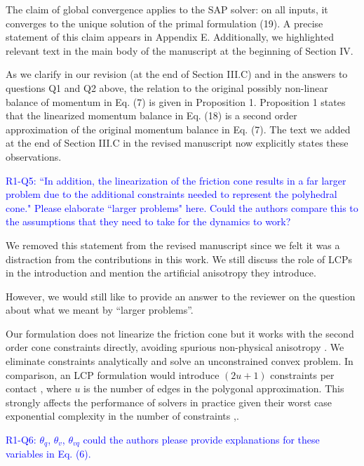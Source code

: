 The claim of global convergence applies to the SAP solver: on all inputs, it
converges to the unique solution of the primal formulation (19). A precise
statement of this claim appears in Appendix E. Additionally, we highlighted
relevant text in the main body of the manuscript at the beginning of Section IV.

As we clarify in our revision (at the end of Section III.C) and in the answers
to questions Q1 and Q2 above, the relation to the original possibly non-linear
balance of momentum in Eq. (7) is given in Proposition 1. Proposition 1 states
that the linearized momentum balance in Eq. (18) is a second order approximation
of the original momentum balance in Eq. (7). The text we added at the end of
Section III.C in the revised manuscript now explicitly states these
observations.
\vspace{5mm}

\textcolor{blue}{R1-Q5: ``In addition, the linearization of the friction cone
results in a far larger problem due to the additional constraints needed to
represent the polyhedral cone." Please elaborate ``larger problems" here. Could
the authors compare this to the assumptions that they need to take for the
dynamics to work?}

We removed this statement from the revised manuscript since we felt it was a
distraction from the contributions in this work. We still discuss the
role of LCPs in the introduction and mention the artificial anisotropy they
introduce.

However, we would still like to provide an answer to the reviewer on the
question about what we meant by ``larger problems''.

Our formulation does not linearize the friction cone but it works with the
second order cone constraints directly, avoiding spurious non-physical
anisotropy \cite{bib:li2018implicit}. We eliminate constraints analytically and
solve an unconstrained convex problem. In comparison, an LCP formulation would
introduce $(2u+1)$ constraints per contact \cite{bib:anitescu1997}, where $u$ is
the number of edges in the polygonal approximation. This strongly affects the
performance of solvers in practice given their worst case exponential complexity
in the number of constraints
\cite{bib:baraff1994fast},\cite{bib:erleben2007velocity}.

\vspace{5mm}

\textcolor{blue}{R1-Q6: $\theta_q$, $\theta_v$, $\theta_{vq}$ could the authors
please provide explanations for these variables in Eq. (6).}


